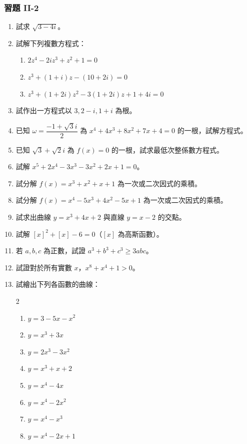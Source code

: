 \subsubsection*{習題 II-2}\label{sec:b6-ex2-2}

\begin{enumerate}[label=\arabic*., leftmargin=2em]
  \item 試求 $\sqrt{3-4i}$。
  \item 試解下列複數方程式：
  \begin{enumerate}[label=(\roman*)]
    \item $2z^4 - 2iz^3 + z^2 + 1 = 0$
    \item $z^3 + (1+i)z - (10+2i) = 0$
    \item $z^3 + (1+2i)z^2 - 3(1+2i)z + 1 + 4i = 0$
  \end{enumerate}
  \item 試作出一方程式以 $3, 2-i, 1+i$ 為根。
  \item 已知 $\omega = \dfrac{-1+\sqrt{3}i}{2}$ 為 $x^4+4x^3+8x^2+7x+4=0$ 的一根，試解方程式。
  \item 已知 $\sqrt{3}+\sqrt{2}i$ 為 $f(x)=0$ 的一根，試求最低次整係數方程式。
  \item 試解 $x^5+2x^4-3x^3-3x^2+2x+1=0$。
  \item 試分解 $f(x)=x^3+x^2+x+1$ 為一次或二次因式的乘積。
  \item 試分解 $f(x)=x^4-5x^3+4x^2-5x+1$ 為一次或二次因式的乘積。
  \item 試求出曲線 $y=x^3+4x+2$ 與直線 $y=x-2$ 的交點。
  \item 試解 $[x]^2+[x]-6=0$（$[x]$ 為高斯函數）。
  \item 若 $a, b, c$ 為正數，試證 $a^3+b^3+c^3 \ge 3abc$。
  \item 試證對於所有實數 $x$，$x^8+x^4+1 > 0$。
  \item 試繪出下列各函數的曲線：
  \begin{multicols}{2}
  \begin{enumerate}[label=(\roman*)]
    \item $y = 3 - 5x - x^2$
    \item $y = x^3 + 3x$
    \item $y = 2x^3 - 3x^2$
    \item $y = x^3 + x + 2$
    \item $y = x^4 - 4x$
    \item $y = x^4 - 2x^2$
    \item $y = x^4 - x^3$
    \item $y = x^4 - 2x + 1$
  \end{enumerate}
  \end{multicols}
\end{enumerate}

